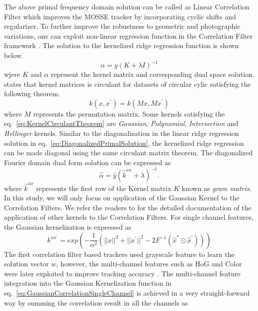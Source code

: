 \documentclass[10pt,twocolumn,letterpaper]{article}
\begin{document}
The above primal frequency domain solution can be called as Linear Correlation Filter which improves the MOSSE tracker by incorporating cyclic shifts and regularizer. To further improve the robustness to geometric and photographic variations, one can exploit non-linear regression function in the Correlation Filter framework \cite{henriques2015high}. The solution to the kernelized ridge regression function is shown below.
\begin{equation}
\alpha = y(K+\lambda I)^{-1}
\end{equation}
wjere $K$ and $\alpha$ represent the kernel matrix and corresponding dual space solution. \cite{henriques2015high} states that kernel matrices is circulant for datasets of circular cylic satisfying the following theorem. 
\begin{equation}
k(x,x^{'}) = k(Mx,Mx^{'})
\label{eq:KernelCirculantTheorem}
\end{equation}
where $M$ represents the permutation matrix. Some kernels satisfying the eq.~\ref{eq:KernelCirculantTheorem} are \textit{Gaussian}, \textit{Polynomial}, \textit{Intersection} and \textit{Hellinger} kernels. Similar to the diagonalization in the linear ridge regression solution in eq.~\ref{eq:DiagonalizedPrimalSolution}, the kernelized ridge regression can be made diagonal using the same circulant matrix theorem.  The diagonalized Fourier domain dual form solution can be expressed as
\begin{equation}
\hat{\alpha} = \hat{y}(\hat{k}^{xx}+\lambda)^{-1}
\label{eq:FourierDualDomainSolution}.
\end{equation}
where $\hat{k}^{xx}$ represents the first row of the Kernel matrix $K$ known as \textit{gram matrix}. In this study, we will only focus on application of the Gaussian Kernel to the Correlation Filters. We refer the readers to \cite{henriques2015high} for the detailed documentation of the application of other kernels to the Correlation Filters. For single channel features, the Gaussian kernelization is expressed as
\begin{equation}
k^{xx^{'}} = exp(-\dfrac{1}{\alpha^{2}}(||x||^{2}+||x^{'}||^{2}-2F^{-1}(\hat{x}^{*}\odot \hat{x}^{'})))
\label{eq:GaussianCorrelationSingleChannel}
\end{equation}
The first correlation filter based trackers used grayscale feature to learn the solution vector $w$, however, the multi-channel features such as HoG and Color were later exploited to improve tracking accuracy \cite{henriques2015high,galoogahi2013multi,tang2015multi,ma2015long,bibi2015multi}. The multi-channel feature integration into the Gaussian Kernelization function in eq.~\ref{eq:GaussianCorrelationSingleChannel} is achieved in a very straight-forward way by summing the correlation result in all the channels as
\end{document}
